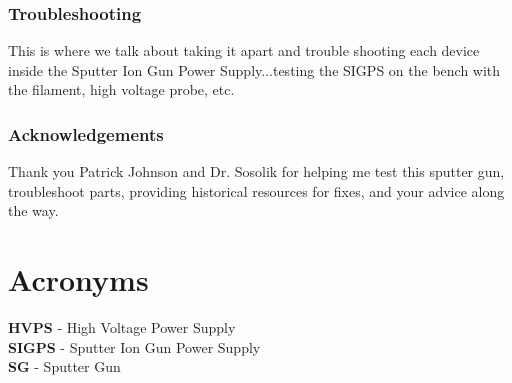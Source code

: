 \documentclass[11pt,a4paper]{report}
\begin{document}
\subsection{Troubleshooting}
This is where we talk about taking it apart and trouble shooting each device inside the Sputter Ion Gun Power Supply...testing the SIGPS on the bench with the filament, high voltage probe, etc.


\subsection{Acknowledgements}
Thank you Patrick Johnson and Dr. Sosolik for helping me test this sputter gun, troubleshoot parts, providing historical resources for fixes, and your advice along the way.

\twocolumn
\newpage

\appendix
\chapter{Acronyms}
\textbf{HVPS} - High Voltage Power Supply
\\
\textbf{SIGPS} - Sputter Ion Gun Power Supply
\\
\textbf{SG} - Sputter Gun

%
%
\end{document}
